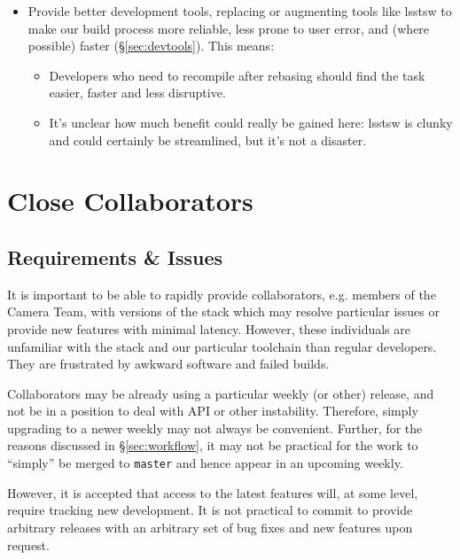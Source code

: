 \documentclass[letterpaper]{scrartcl}
\begin{document}
\begin{itemize}
{\begin{itemize}
    \end{itemize}

  }

  \item{Provide better development tools, replacing or augmenting tools like
  lsstsw to make our build process more reliable, less prone to user error,
  and (where possible) faster (\S\ref{sec:devtools}). This means:

    \begin{itemize}

      \item{Developers who need to recompile after rebasing should find the
      task easier, faster and less disruptive.}

      \item{It's unclear how much benefit could really be gained here: lsstsw
      is clunky and could certainly be streamlined, but it's not a disaster.}

    \end{itemize}

  }

\end{itemize}

\section{Close Collaborators}
\label{sec:collaborators}

\subsection{Requirements \& Issues}

It is important to be able to rapidly provide collaborators, e.g. members of
the Camera Team, with versions of the stack which may resolve particular
issues or provide new features with minimal latency. However, these
individuals are unfamiliar with the stack and our particular toolchain than
regular developers. They are frustrated by awkward software and failed builds.

Collaborators may be already using a particular weekly (or other) release, and
not be in a position to deal with API or other instability. Therefore, simply
upgrading to a newer weekly may not always be convenient. Further, for the
reasons discussed in \S\ref{sec:workflow}, it may not be practical for the
work to ``simply'' be merged to \texttt{master} and hence appear in an
upcoming weekly.

However, it is accepted that access to the latest features will, at some
level, require tracking new development. It is not practical to commit to
provide arbitrary releases with an arbitrary set of bug fixes and new features
upon request.
\end{document}
